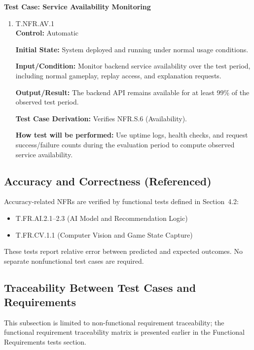\documentclass[12pt, titlepage]{article}
\begin{document}
\textbf{Test Case: Service Availability Monitoring}

\begin{enumerate}
\item{\hypertarget{T.NFR.AV.1}{T.NFR.AV.1}\\}
\textbf{Control:} Automatic

\textbf{Initial State:} System deployed and running under normal usage conditions.

\textbf{Input/Condition:} Monitor backend service availability over the test period,
including normal gameplay, replay access, and explanation requests.

\textbf{Output/Result:} The backend API remains available for at least 99\% of the
observed test period.

\textbf{Test Case Derivation:} Verifies NFR.S.6 (Availability).

\textbf{How test will be performed:} Use uptime logs, health checks, and request
success/failure counts during the evaluation period to compute observed service availability.
\end{enumerate}

\subsection{Accuracy and Correctness (Referenced)}

Accuracy-related NFRs are verified by functional tests defined in Section~4.2:
\begin{itemize}
    \item T.FR.AI.2.1--2.3 (AI Model and Recommendation Logic)
    \item T.FR.CV.1.1 (Computer Vision and Game State Capture)
\end{itemize}
These tests report relative error between predicted and expected outcomes. No separate nonfunctional test cases are required.

\subsection{Traceability Between Test Cases and Requirements }

This subsection is limited to non-functional requirement traceability; the functional requirement traceability matrix is presented earlier in the Functional Requirements tests section.
\end{document}
